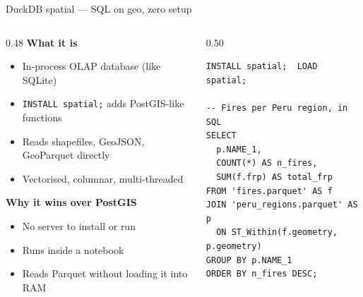 \documentclass[10pt,aspectratio=169]{beamer}
\begin{document}
\begin{frame}[fragile]{DuckDB spatial — SQL on geo, zero setup}
  \begin{columns}[T]
    \begin{column}{0.48\textwidth}
      \textbf{What it is}
      \begin{itemize}\itemsep2pt
        \item In-process OLAP database (like SQLite)
        \item \texttt{INSTALL spatial;} adds PostGIS-like functions
        \item Reads shapefiles, GeoJSON, GeoParquet directly
        \item Vectorised, columnar, multi-threaded
      \end{itemize}
      \vspace{0.4em}
      \textbf{Why it wins over PostGIS}
      \begin{itemize}\itemsep2pt
        \item No server to install or run
        \item Runs inside a notebook
        \item Reads Parquet without loading it into RAM
      \end{itemize}
    \end{column}
    \begin{column}{0.50\textwidth}
\begin{lstlisting}[style=sql]
INSTALL spatial;  LOAD spatial;

-- Fires per Peru region, in SQL
SELECT
  p.NAME_1,
  COUNT(*) AS n_fires,
  SUM(f.frp) AS total_frp
FROM 'fires.parquet' AS f
JOIN 'peru_regions.parquet' AS p
  ON ST_Within(f.geometry, p.geometry)
GROUP BY p.NAME_1
ORDER BY n_fires DESC;
\end{lstlisting}
    \end{column}
  \end{columns}
\end{frame}
\end{document}
